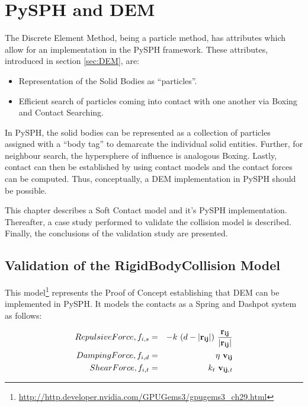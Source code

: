 \chapter{PySPH and DEM}

The Discrete Element Method, being a particle method, has attributes which allow for an implementation in the PySPH framework. These attributes, introduced in section \ref{sec:DEM}, are:

\begin{itemize}
\item Representation of the Solid Bodies as ``particles''.
\item Efficient search of particles coming into contact with one another via Boxing and Contact Searching.
\end{itemize}

In PySPH, the solid bodies can be represented as a collection of particles assigned with a ``body tag'' to demarcate the individual solid entities. Further, for neighbour search, the hypersphere of influence is analogous Boxing. Lastly, contact can then be established by using contact models and the contact forces can be computed. Thus, conceptually, a DEM implementation in PySPH should be possible.

This chapter describes a Soft Contact model and it's PySPH implementation. Thereafter, a case study performed to validate the collision model is described. Finally, the conclusions of the validation study are presented.

\section{Validation of the RigidBodyCollision Model}

This model\cite{gpu_gems}\footnote[8]{\url{http://http.developer.nvidia.com/GPUGems3/gpugems3_ch29.html}} represents the Proof of Concept establishing that DEM can be implemented in PySPH. It models the contacts as a Spring and Dashpot system as follows:

\begin{eqnarray}\label{eq:RigidBodyCollision}
Repulsive Force, f_{i,s} &=& -k~(d-|{\bf{r_{ij}}}|)~\frac{{\bf{r_{ij}}}}{|{\bf{r_{ij}}}|} \nonumber\\
Damping Force, f_{i,d} &=& \eta ~ {\bf{v_{ij}}} \\
Shear Force, f_{i,t} &=& k_{t}~{\bf{v_{ij,{\it{t}}}}} \nonumber
\end{eqnarray}


